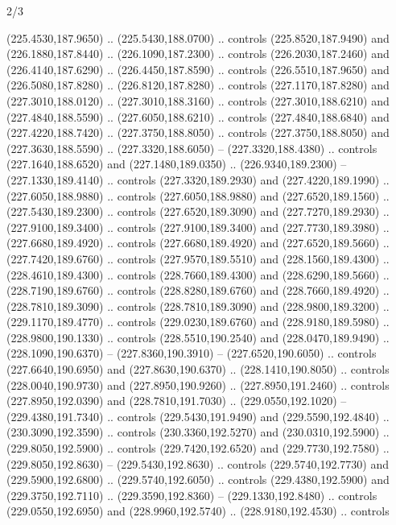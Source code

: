 \begin{flagdescription}{2/3}
\begin{scope}[xshift=0.5\flaglength,yshift=0.5\flagwidth,scale=\flagwidth/259.2]
\begin{scope}[y=0.8pt, x=0.8pt, yscale=-1,shift={(-243,-162)}]
      (225.4530,187.9650) .. (225.5430,188.0700) .. controls (225.8520,187.9490) and
      (226.1880,187.8440) .. (226.1090,187.2300) .. controls (226.2030,187.2460) and
      (226.4140,187.6290) .. (226.4450,187.8590) .. controls (226.5510,187.9650) and
      (226.5080,187.8280) .. (226.8120,187.8280) .. controls (227.1170,187.8280) and
      (227.3010,188.0120) .. (227.3010,188.3160) .. controls (227.3010,188.6210) and
      (227.4840,188.5590) .. (227.6050,188.6210) .. controls (227.4840,188.6840) and
      (227.4220,188.7420) .. (227.3750,188.8050) .. controls (227.3750,188.8050) and
      (227.3630,188.5590) .. (227.3320,188.6050) -- (227.3320,188.4380) .. controls
      (227.1640,188.6520) and (227.1480,189.0350) .. (226.9340,189.2300) --
      (227.1330,189.4140) .. controls (227.3320,189.2930) and (227.4220,189.1990) ..
      (227.6050,188.9880) .. controls (227.6050,188.9880) and (227.6520,189.1560) ..
      (227.5430,189.2300) .. controls (227.6520,189.3090) and (227.7270,189.2930) ..
      (227.9100,189.3400) .. controls (227.9100,189.3400) and (227.7730,189.3980) ..
      (227.6680,189.4920) .. controls (227.6680,189.4920) and (227.6520,189.5660) ..
      (227.7420,189.6760) .. controls (227.9570,189.5510) and (228.1560,189.4300) ..
      (228.4610,189.4300) .. controls (228.7660,189.4300) and (228.6290,189.5660) ..
      (228.7190,189.6760) .. controls (228.8280,189.6760) and (228.7660,189.4920) ..
      (228.7810,189.3090) .. controls (228.7810,189.3090) and (228.9800,189.3200) ..
      (229.1170,189.4770) .. controls (229.0230,189.6760) and (228.9180,189.5980) ..
      (228.9800,190.1330) .. controls (228.5510,190.2540) and (228.0470,189.9490) ..
      (228.1090,190.6370) -- (227.8360,190.3910) -- (227.6520,190.6050) .. controls
      (227.6640,190.6950) and (227.8630,190.6370) .. (228.1410,190.8050) .. controls
      (228.0040,190.9730) and (227.8950,190.9260) .. (227.8950,191.2460) .. controls
      (227.8950,192.0390) and (228.7810,191.7030) .. (229.0550,192.1020) --
      (229.4380,191.7340) .. controls (229.5430,191.9490) and (229.5590,192.4840) ..
      (230.3090,192.3590) .. controls (230.3360,192.5270) and (230.0310,192.5900) ..
      (229.8050,192.5900) .. controls (229.7420,192.6520) and (229.7730,192.7580) ..
      (229.8050,192.8630) -- (229.5430,192.8630) .. controls (229.5740,192.7730) and
      (229.5900,192.6800) .. (229.5740,192.6050) .. controls (229.4380,192.5900) and
      (229.3750,192.7110) .. (229.3590,192.8360) -- (229.1330,192.8480) .. controls
      (229.0550,192.6950) and (228.9960,192.5740) .. (228.9180,192.4530) .. controls

\end{scope}
\end{scope}
\end{flagdescription}
